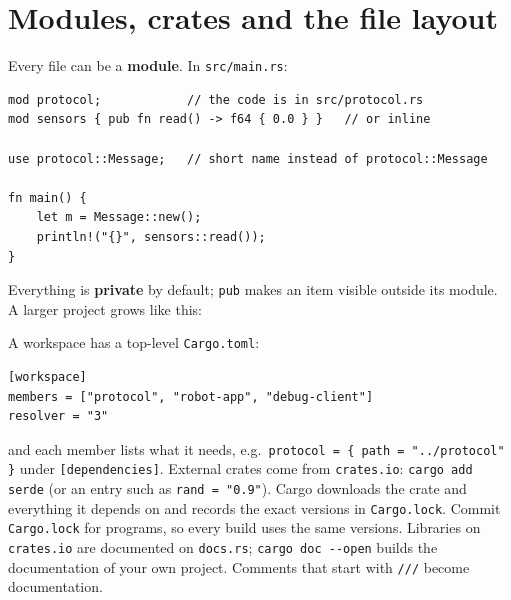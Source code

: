 \section*{Modules, crates and the file layout}
Every file can be a \textbf{module}. In \verb!src/main.rs!:
\begin{verbatim}
mod protocol;            // the code is in src/protocol.rs
mod sensors { pub fn read() -> f64 { 0.0 } }   // or inline

use protocol::Message;   // short name instead of protocol::Message

fn main() {
    let m = Message::new();
    println!("{}", sensors::read());
}
\end{verbatim}
Everything is \textbf{private} by default; \verb!pub! makes an item visible outside its module. A larger project grows like this:
\begin{center}
\end{center}
A workspace has a top-level \verb!Cargo.toml!:
\begin{verbatim}
[workspace]
members = ["protocol", "robot-app", "debug-client"]
resolver = "3"
\end{verbatim}
and each member lists what it needs, e.g.\ \verb!protocol = { path = "../protocol" }! under \verb![dependencies]!. External crates come from \verb!crates.io!: \verb!cargo add serde! (or an entry such as \verb!rand = "0.9"!). Cargo downloads the crate and everything it depends on and records the exact versions in \verb!Cargo.lock!. Commit \verb!Cargo.lock! for programs, so every build uses the same versions. Libraries on \verb!crates.io! are documented on \verb!docs.rs!; \verb!cargo doc --open! builds the documentation of your own project. Comments that start with \verb!///! become documentation.

